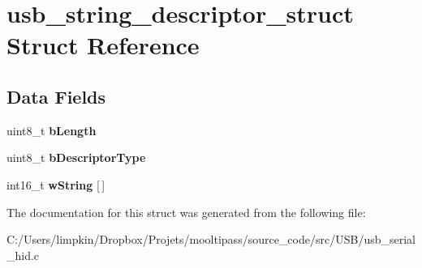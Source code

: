 \hypertarget{structusb__string__descriptor__struct}{\section{usb\-\_\-string\-\_\-descriptor\-\_\-struct Struct Reference}
\label{structusb__string__descriptor__struct}
}
\subsection*{Data Fields}
\begin{DoxyCompactItemize}
\item 
\hypertarget{structusb__string__descriptor__struct_a1deca1f1d6e5815b290e6e1015bce5b8}{uint8\-\_\-t {\bfseries b\-Length}}\label{structusb__string__descriptor__struct_a1deca1f1d6e5815b290e6e1015bce5b8}

\item 
\hypertarget{structusb__string__descriptor__struct_a67d7027b9eb9ed268d28e84fbc675707}{uint8\-\_\-t {\bfseries b\-Descriptor\-Type}}\label{structusb__string__descriptor__struct_a67d7027b9eb9ed268d28e84fbc675707}

\item 
\hypertarget{structusb__string__descriptor__struct_a73b6a1a52dd1abac3cef0d39a6e340a5}{int16\-\_\-t {\bfseries w\-String} \mbox{[}$\,$\mbox{]}}\label{structusb__string__descriptor__struct_a73b6a1a52dd1abac3cef0d39a6e340a5}

\end{DoxyCompactItemize}


The documentation for this struct was generated from the following file\-:\begin{DoxyCompactItemize}
\item 
C\-:/\-Users/limpkin/\-Dropbox/\-Projets/mooltipass/source\-\_\-code/src/\-U\-S\-B/usb\-\_\-serial\-\_\-hid.\-c\end{DoxyCompactItemize}
